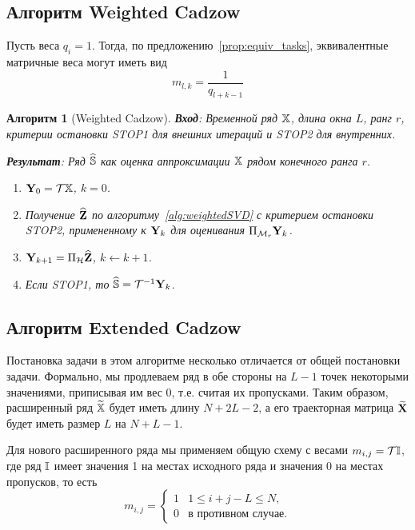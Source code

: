 \documentclass[12pt,a4paper,fleqn,leqno]{article}
\newtheorem{algorithm}{Алгоритм}
\begin{document}
\subsection{Алгоритм Weighted Cadzow}

Пусть веса $q_{i}=1$. Тогда, по предложению~\ref{prop:equiv_tasks}, эквивалентные матричные веса могут иметь вид
\begin{equation}
\label{Mw}
   m_{l, k} = \frac{1}{q_{l + k - 1}}
\end{equation}

\begin{algorithm}[Weighted Cadzow]
\textbf{Вход}: Временной ряд $\mathbb{X}$, длина окна $L$, ранг $r$,
критерии остановки STOP1 для внешних итераций и STOP2 для внутренних.

\textbf{Результат}:
Ряд $\widehat{\mathbb{S}}$ как оценка аппроксимации $\mathbb{X}$ рядом конечного ранга $r$.

\begin{enumerate}
\item
$\mathbf{Y}_0 = \mathcal{T} \mathbb{X}$, $k=0$.
\item
Получение $\widehat{\mathbf{Z}}$ по алгоритму~\ref{alg:weightedSVD} с критерием остановки STOP2, примененному к $\mathbf{Y}_k$ для оценивания $\Pi_{\mathcal{M}_r} \mathbf{Y}_{k}$.
\item
$\mathbf{Y}_{k+1} = \Pi_{\mathcal{H}}  \widehat{\mathbf{Z}}$, $k\leftarrow k+1$.
\item
Если STOP1, то $\widehat{\mathbb{S}} = \mathcal{T}^{-1} \mathbf{Y}_k$.
\end{enumerate}
\end{algorithm}

\subsection{Алгоритм Extended Cadzow}

Постановка задачи в этом алгоритме несколько отличается от общей постановки задачи.
Формально, мы продлеваем ряд в обе стороны на $L-1$ точек некоторыми значениями, приписывая им вес 0, т.е.
считая их пропусками. Таким образом, расширенный ряд $\widetilde{\mathbb{X}}$ будет иметь длину $N+2L-2$, а его траекторная матрица
$\widetilde{\mathbf{X}}$ будет иметь размер $L$ на $N+L-1$.

Для нового расширенного ряда мы применяем общую схему с весами $m_{i,j}=\mathcal{T} \mathbb{I}$, где ряд $\mathbb{I}$ имеет
значения 1 на местах исходного ряда и значения 0 на местах пропусков, то есть
\begin{equation*}
m_{i,j} = \begin{cases}
1 & 1 \le i+j-L \le N, \\
0 & \text{в противном случае.}
\end{cases}
\end{equation*}
\end{document}
